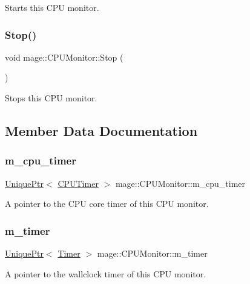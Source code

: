 Starts this C\+PU monitor. \hypertarget{classmage_1_1_c_p_u_monitor_aa798a71d7bd5ec79391e6db5f9cf967b}{}\label{classmage_1_1_c_p_u_monitor_aa798a71d7bd5ec79391e6db5f9cf967b} 
\subsubsection{\texorpdfstring{Stop()}{Stop()}}
{\footnotesize\ttfamily void mage\+::\+C\+P\+U\+Monitor\+::\+Stop (\begin{DoxyParamCaption}{ }\end{DoxyParamCaption})}

Stops this C\+PU monitor. 

\subsection{Member Data Documentation}
\hypertarget{classmage_1_1_c_p_u_monitor_a925f9d2366d798f2dba783a3ab25f651}{}\label{classmage_1_1_c_p_u_monitor_a925f9d2366d798f2dba783a3ab25f651} 
\subsubsection{\texorpdfstring{m\+\_\+cpu\+\_\+timer}{m\_cpu\_timer}}
{\footnotesize\ttfamily \hyperlink{namespacemage_a8c307fbcc33bce9b7f2aa4c26c3b95cf}{Unique\+Ptr}$<$ \hyperlink{classmage_1_1_c_p_u_timer}{C\+P\+U\+Timer} $>$ mage\+::\+C\+P\+U\+Monitor\+::m\+\_\+cpu\+\_\+timer\hspace{0.3cm}{\ttfamily [private]}}

A pointer to the C\+PU core timer of this C\+PU monitor. \hypertarget{classmage_1_1_c_p_u_monitor_a5d24b6b9d684a6d0c34175052a8ac850}{}\label{classmage_1_1_c_p_u_monitor_a5d24b6b9d684a6d0c34175052a8ac850} 
\subsubsection{\texorpdfstring{m\+\_\+timer}{m\_timer}}
{\footnotesize\ttfamily \hyperlink{namespacemage_a8c307fbcc33bce9b7f2aa4c26c3b95cf}{Unique\+Ptr}$<$ \hyperlink{classmage_1_1_timer}{Timer} $>$ mage\+::\+C\+P\+U\+Monitor\+::m\+\_\+timer\hspace{0.3cm}{\ttfamily [private]}}

A pointer to the wallclock timer of this C\+PU monitor. 